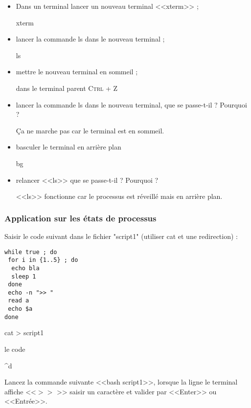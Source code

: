 \documentclass[11pt]{article}
\begin{document}
\begin{itemize}
 \item Dans un terminal lancer un nouveau terminal <<xterm>> ;
\begin{solution}
xterm
\end{solution}	 
 \item lancer la commande ls dans le nouveau terminal ;
\begin{solution}
ls
\end{solution}   
 \item mettre le nouveau terminal en sommeil ;
\begin{solution}
dans le terminal parent \textsc{Ctrl + Z}
\end{solution}
 \item lancer la commande ls dans le nouveau terminal, que se passe-t-il ? Pourquoi ?
\begin{solution}
Ça ne marche pas car le terminal est en sommeil.
\end{solution}
 \item basculer le terminal en arrière plan
\begin{solution}
bg
\end{solution}
 \item relancer <<ls>> que se passe-t-il ? Pourquoi ?
\begin{solution}
<<ls>> fonctionne car le processus est réveillé mais en arrière plan.
\end{solution}
\end{itemize}

\subsubsection{Application sur les états de processus}

Saisir le code suivant dans le fichier "script1" (utiliser cat et une redirection) :

\begin{lstlisting}
while true ; do 
 for i in {1..5} ; do 
  echo bla
  sleep 1
 done
 echo -n ">> "
 read a
 echo $a
done
\end{lstlisting}

\begin{solution}

cat > script1

le code

\^{}d

\end{solution}

Lancez la commande suivante <<bash script1>>, lorsque la ligne le terminal affiche <<$>> $ >> saisir un caractère et valider par <<Enter>> ou <<Entrée>>.
\end{document}
